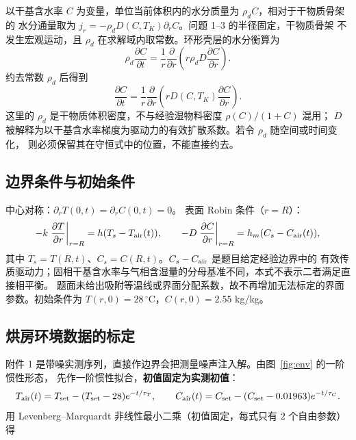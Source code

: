 \documentclass[bwprint]{cumcmthesis}
\begin{document}
以干基含水率 $C$ 为变量，单位当前体积内的水分质量为 $\rho_dC$，相对于干物质骨架的
水分通量取为 $j_r=-\rho_dD(C,T_K)\partial_rC$。问题 1--3 的半径固定，干物质骨架
不发生宏观运动，且 $\rho_d$ 在求解域内取常数。环形壳层的水分衡算为
\[
\rho_d\frac{\partial C}{\partial t}
=\frac{1}{r}\frac{\partial}{\partial r}
\left(r\rho_dD\frac{\partial C}{\partial r}\right).
\]
约去常数 $\rho_d$ 后得到
\begin{equation}
\frac{\partial C}{\partial t}
=\frac{1}{r}\frac{\partial}{\partial r}\left(rD(C,T_K)\frac{\partial C}{\partial r}\right).
\label{eq:mass}
\end{equation}
这里的 $\rho_d$ 是干物质体积密度，不与经验湿物料密度 $\rho(C)/(1+C)$ 混用；
$D$ 被解释为以干基含水率梯度为驱动力的有效扩散系数。若令 $\rho_d$ 随空间或时间变化，
则必须保留其在守恒式中的位置，不能直接约去。

\subsection{边界条件与初始条件}

中心对称：$\partial_rT(0,t)=\partial_rC(0,t)=0$。
表面 Robin 条件（$r=R$）：
\begin{equation}
-k\left.\frac{\partial T}{\partial r}\right|_{r=R}=h(T_s-T_{\rm air}(t)),
\qquad
-D\left.\frac{\partial C}{\partial r}\right|_{r=R}=h_m(C_s-C_{\rm air}(t)),
\label{eq:robin}
\end{equation}
其中 $T_s=T(R,t)$、$C_s=C(R,t)$。$C_s-C_{\rm air}$ 是题目给定经验边界中的
有效传质驱动力；固相干基含水率与气相含湿量的分母基准不同，本式不表示二者满足直接相平衡。
题面未给出吸附等温线或界面分配系数，故不再增加无法标定的界面参数。初始条件为
$T(r,0)=28\,^\circ$C，$C(r,0)=2.55$ kg/kg。

\subsection{烘房环境数据的标定}
\label{sec:calib}

附件 1 是带噪实测序列，直接作边界会把测量噪声注入解。由图~\ref{fig:env} 的一阶惯性形态，
先作一阶惯性拟合，\textbf{初值固定为实测初值}：
\begin{equation}
T_{\rm air}(t)=T_{\rm set}-(T_{\rm set}-28)e^{-t/\tau_T},
\qquad
C_{\rm air}(t)=C_{\rm set}-(C_{\rm set}-0.01963)e^{-t/\tau_C}.
\label{eq:ambient}
\end{equation}
用 Levenberg--Marquardt 非线性最小二乘（初值固定，每式只有 $2$ 个自由参数）得
\end{document}

